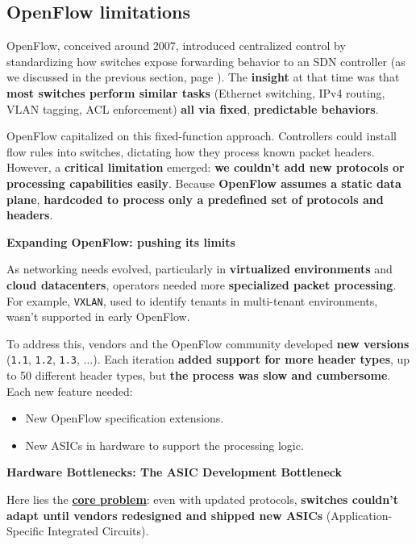 \subsection{OpenFlow limitations}

OpenFlow, conceived around 2007, introduced centralized control by standardizing how switches expose forwarding behavior to an SDN controller (as we discussed in the previous section, page \pageref{subsection: OpenFlow}). The \textbf{insight} at that time was that \textbf{most switches perform similar tasks} (Ethernet switching, IPv4 routing, VLAN tagging, ACL enforcement) \textbf{all via fixed}, \textbf{predictable behaviors}.

\highspace
OpenFlow capitalized on this fixed-function approach. Controllers could install flow rules into switches, dictating how they process known packet headers. However, a \textcolor{Red2}{\textbf{critical limitation}} emerged: \textbf{we couldn't add new protocols or processing capabilities easily}. Because \textbf{OpenFlow assumes a static data plane}, \textcolor{Red2}{\textbf{hardcoded to process only a predefined set of protocols and headers}}.

\highspace
\begin{flushleft}
    \textcolor{Green3}{ \textbf{Expanding OpenFlow: pushing its limits}}
\end{flushleft}
As networking needs evolved, particularly in \textbf{virtualized environments} and \textbf{cloud datacenters}, operators needed more \textbf{specialized packet processing}. For example, \texttt{VXLAN}, used to identify tenants in multi-tenant environments, wasn't supported in early OpenFlow.

\highspace
\textcolor{Green3}{} To address this, vendors and the OpenFlow community developed \textbf{new versions} (\texttt{1.1}, \texttt{1.2}, \texttt{1.3}, $\dots$). Each iteration \textbf{added support for more header types}, up to 50 different header types, but \textcolor{Red2}{\textbf{the process was slow and cumbersome}}. Each new feature needed:
\begin{itemize}
    \item New OpenFlow specification extensions.
    \item New ASICs in hardware to support the processing logic.
\end{itemize}

\highspace
\begin{flushleft}
    \textcolor{Red2}{ \textbf{Hardware Bottlenecks: The ASIC Development Bottleneck}}
\end{flushleft}
Here lies the \textbf{\underline{core problem}}: even with updated protocols, \textbf{switches couldn't adapt until vendors redesigned and shipped new ASICs} (Application-Specific Integrated Circuits).

